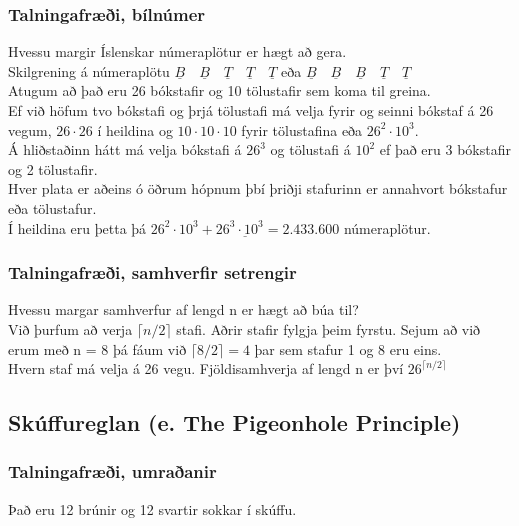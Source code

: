 \subsubsection{Talningafræði, bílnúmer}
Hvessu margir Íslenskar númeraplötur er hægt að gera.\vspace*{0.5em}\\
Skilgrening á númeraplötu $\underline{B}\quad\underline{B}\quad\underline{T}\quad\underline{T}\quad\underline{T}$ eða $\underline{B}\quad\underline{B}\quad\underline{B}\quad\underline{T}\quad\underline{T}$\vspace*{0.5em}\\
Atugum að það eru 26 bókstafir og 10 tölustafir sem koma til greina.\\
Ef við höfum tvo bókstafi og þrjá tölustafi má velja fyrir og seinni bókstaf á 26 vegum, $26 \cdot 26$ í heildina og $10\cdot 10 \cdot 10$ fyrir tölustafina eða $26^2 \cdot 10^3$.\vspace*{0.5em}\\
Á hliðstaðinn hátt má velja bókstafi á $26^3$ og tölustafi á $10^2$ ef það eru 3 bókstafir og 2 tölustafir.\vspace*{0.5em}\\ 
Hver plata er aðeins ó öðrum hópnum þbí þriðji stafurinn er annahvort bókstafur eða tölustafur.\vspace*{0.5em}\\ 
Í heildina eru þetta þá $\underline{26^2 \cdot 10^3 + 26^3 \cdot 10^3 = 2.433.600}$ númeraplötur.
\newpage

\subsubsection{Talningafræði, samhverfir setrengir}
Hvessu margar samhverfur af lengd n er hægt að búa til?\vspace*{0.5em}\\
Við þurfum að verja $\lceil n/2 \rceil$ stafi. Aðrir stafir fylgja þeim fyrstu. Sejum að við erum með n = 8 þá fáum við $\lceil 8/2 \rceil = 4$ þar sem stafur 1 og 8 eru eins.\vspace*{0.5em}\\
Hvern staf má velja á 26 vegu. Fjöldisamhverja af lengd n er því $26^{\lceil n/2 \rceil}$

\subsection{Skúffureglan (e. The Pigeonhole Principle)}
\subsubsection{Talningafræði, umraðanir}
Það eru 12 brúnir og 12 svartir sokkar í skúffu.\vspace*{0.5em}

